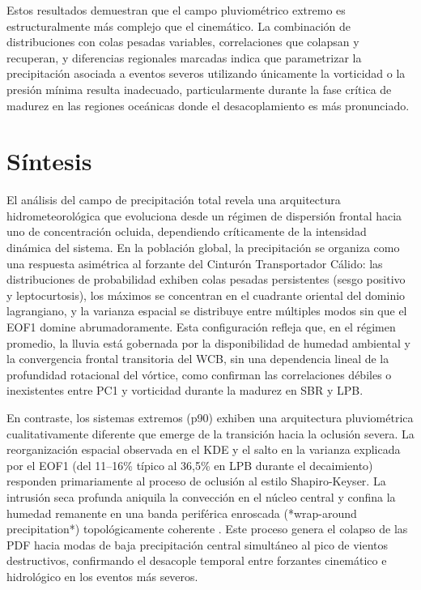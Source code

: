 Estos resultados demuestran que el campo pluviométrico extremo es estructuralmente más complejo que el cinemático. La combinación de distribuciones con colas pesadas variables, correlaciones que colapsan y recuperan, y diferencias regionales marcadas indica que parametrizar la precipitación asociada a eventos severos utilizando únicamente la vorticidad o la presión mínima resulta inadecuado, particularmente durante la fase crítica de madurez en las regiones oceánicas donde el desacoplamiento es más pronunciado.

\section{Síntesis}\label{sec:sintesis_tp}

El análisis del campo de precipitación total revela una arquitectura hidrometeorológica que evoluciona desde un régimen de dispersión frontal hacia uno de concentración ocluida, dependiendo críticamente de la intensidad dinámica del sistema. En la población global, la precipitación se organiza como una respuesta asimétrica al forzante del Cinturón Transportador Cálido: las distribuciones de probabilidad exhiben colas pesadas persistentes (sesgo positivo y leptocurtosis), los máximos se concentran en el cuadrante oriental del dominio lagrangiano, y la varianza espacial se distribuye entre múltiples modos sin que el EOF1 domine abrumadoramente. Esta configuración refleja que, en el régimen promedio, la lluvia está gobernada por la disponibilidad de humedad ambiental y la convergencia frontal transitoria del WCB, sin una dependencia lineal de la profundidad rotacional del vórtice, como confirman las correlaciones débiles o inexistentes entre PC1 y vorticidad durante la madurez en SBR y LPB.

En contraste, los sistemas extremos (p90) exhiben una arquitectura pluviométrica cualitativamente diferente que emerge de la transición hacia la oclusión severa. La reorganización espacial observada en el KDE y el salto en la varianza explicada por el EOF1 (del 11--16\% típico al 36,5\% en LPB durante el decaimiento) responden primariamente al proceso de oclusión al estilo Shapiro-Keyser. La intrusión seca profunda aniquila la convección en el núcleo central y confina la humedad remanente en una banda periférica enroscada (*wrap-around precipitation*) topológicamente coherente \citep{schultz2021antecedents}. Este proceso genera el colapso de las PDF hacia modas de baja precipitación central simultáneo al pico de vientos destructivos, confirmando el desacople temporal entre forzantes cinemático e hidrológico en los eventos más severos.

